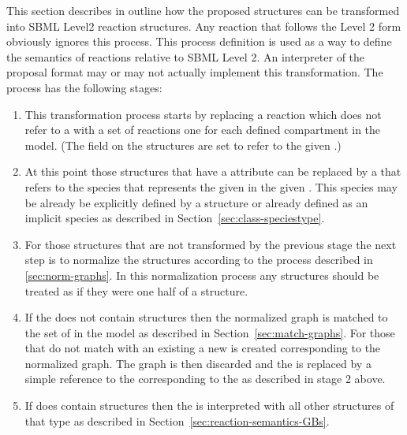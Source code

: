 \documentclass{cekarticle}
\begin{document}
This section describes in outline how the proposed
 structures can be transformed into SBML Level2
reaction structures.  Any reaction that follows the Level 2 form
obviously ignores this process.  This process definition is used
as a way to define the semantics of reactions relative to SBML
Level 2.  An interpreter of the proposal format may or may not
actually implement this transformation.  The process has the
following stages:

\begin{enumerate}

\item This transformation process starts by replacing a reaction
which does not refer to a  with a set of
reactions one for each defined compartment in the model.  (The
 field on the 
structures are set to refer to the given .)

\item At this point those 
structures that have a  attribute can be
replaced by a  that refers to the species that
represents the given  in the given
.  This species may be already be explicitly
defined by a  structure or already defined as an
implicit species as described in
Section~\ref{sec:class-speciestype}.

\item For those  structures that are
not transformed by the previous stage the next step is to
normalize the  structures according
to the process described in \ref{sec:norm-graphs}.  In this
normalization process any  structures should be
treated as if they were one half of a 
structure.

\item If the  does not contain 
structures then the normalized graph is matched to the set of
 in the model as described in
Section~\ref{sec:match-graphs}.  For those that do not match with
an existing  a new  is
created corresponding to the normalized graph.  The graph is then
discarded and the  is replaced by a
simple reference to the  corresponding to the
 as described in stage 2 above.

\item If  does contain 
structures then the  is interpreted with all other
 structures of that type as described in
Section~\ref{sec:reaction-semantics-GBs}.

\end{enumerate}
\end{document}
